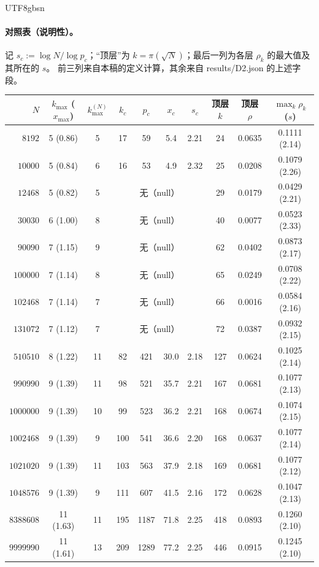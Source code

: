 \documentclass[11pt,a4paper]{article}
\newcommand{\kmax}{k_{\max}}
\theoremstyle{plain}
\theoremstyle{definition}
\begin{document}
\begin{CJK}{UTF8}{gbsn}
\paragraph{对照表（说明性）。} 记 $s_c:=\log N/\log p_c$；“顶层”为 $k=\pi(\sqrt N)$；最后一列为各层 $\rho_k$ 的最大值及其所在的 $s$。
前三列来自本稿的定义计算，其余来自 results/D2.json 的上述字段。
\begin{center}
\small
\begin{tabular}{rcc|cccc|cc|c}
\hline
$N$ & $\kmax$ ($x_{\max}$) & $\kmax^{(N)}$ & $k_c$ & $p_c$ & $x_c$ & $s_c$ & 顶层 $k$ & 顶层 $\rho$ & $\max_k\rho_k$ ($s$)\\
\hline
$8192$ & 5 (0.86) & 5 & 17 & 59 & 5.4 & 2.21 & 24 & 0.0635 & 0.1111 (2.14)\\
$10000$ & 5 (0.84) & 6 & 16 & 53 & 4.9 & 2.32 & 25 & 0.0208 & 0.1079 (2.26)\\
$12468$ & 5 (0.82) & 5 & \multicolumn{4}{c|}{无（null）} & 29 & 0.0179 & 0.0429 (2.21)\\
$30030$ & 6 (1.00) & 8 & \multicolumn{4}{c|}{无（null）} & 40 & 0.0077 & 0.0523 (2.33)\\
$90090$ & 7 (1.15) & 9 & \multicolumn{4}{c|}{无（null）} & 62 & 0.0402 & 0.0873 (2.17)\\
$100000$ & 7 (1.14) & 8 & \multicolumn{4}{c|}{无（null）} & 65 & 0.0249 & 0.0708 (2.22)\\
$102468$ & 7 (1.14) & 7 & \multicolumn{4}{c|}{无（null）} & 66 & 0.0016 & 0.0584 (2.16)\\
$131072$ & 7 (1.12) & 7 & \multicolumn{4}{c|}{无（null）} & 72 & 0.0387 & 0.0932 (2.15)\\
$510510$ & 8 (1.22) & 11 & 82 & 421 & 30.0 & 2.18 & 127 & 0.0624 & 0.1025 (2.14)\\
$990990$ & 9 (1.39) & 11 & 98 & 521 & 35.7 & 2.21 & 167 & 0.0681 & 0.1077 (2.13)\\
$1000000$ & 9 (1.39) & 10 & 99 & 523 & 36.2 & 2.21 & 168 & 0.0674 & 0.1074 (2.15)\\
$1002468$ & 9 (1.39) & 9 & 100 & 541 & 36.6 & 2.20 & 168 & 0.0637 & 0.1077 (2.14)\\
$1021020$ & 9 (1.39) & 11 & 103 & 563 & 37.9 & 2.18 & 169 & 0.0681 & 0.1077 (2.12)\\
$1048576$ & 9 (1.39) & 9 & 111 & 607 & 41.5 & 2.16 & 172 & 0.0628 & 0.1047 (2.13)\\
$8388608$ & 11 (1.63) & 11 & 195 & 1187 & 71.8 & 2.25 & 418 & 0.0893 & 0.1260 (2.10)\\
$9999990$ & 11 (1.61) & 13 & 209 & 1289 & 77.2 & 2.25 & 446 & 0.0915 & 0.1245 (2.10)\\

\end{tabular}
\end{center}
\end{CJK}
\end{document}
